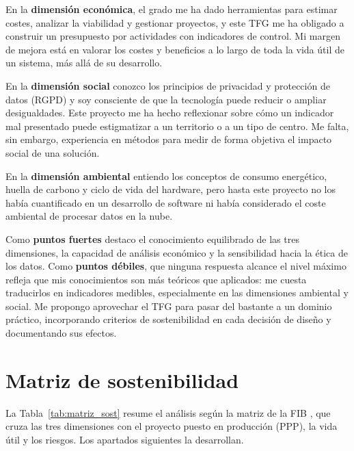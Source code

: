 \documentclass[12pt, a4paper, oneside]{report}
\begin{document}
En la \textbf{dimensión económica}, el grado me ha dado herramientas para estimar costes, analizar la viabilidad y gestionar proyectos, y este TFG me ha obligado a construir un presupuesto por actividades con indicadores de control. Mi margen de mejora está en valorar los costes y beneficios a lo largo de toda la vida útil de un sistema, más allá de su desarrollo.

En la \textbf{dimensión social} conozco los principios de privacidad y protección de datos (RGPD) y soy consciente de que la tecnología puede reducir o ampliar desigualdades. Este proyecto me ha hecho reflexionar sobre cómo un indicador mal presentado puede estigmatizar a un territorio o a un tipo de centro. Me falta, sin embargo, experiencia en métodos para medir de forma objetiva el impacto social de una solución.

En la \textbf{dimensión ambiental} entiendo los conceptos de consumo energético, huella de carbono y ciclo de vida del hardware, pero hasta este proyecto no los había cuantificado en un desarrollo de software ni había considerado el coste ambiental de procesar datos en la nube.

Como \textbf{puntos fuertes} destaco el conocimiento equilibrado de las tres dimensiones, la capacidad de análisis económico y la sensibilidad hacia la ética de los datos. Como \textbf{puntos débiles}, que ninguna respuesta alcance el nivel máximo refleja que mis conocimientos son más teóricos que aplicados: me cuesta traducirlos en indicadores medibles, especialmente en las dimensiones ambiental y social. Me propongo aprovechar el TFG para pasar del \guillemotleft{}bastante\guillemotright{} a un dominio práctico, incorporando criterios de sostenibilidad en cada decisión de diseño y documentando sus efectos.

\section{Matriz de sostenibilidad}
La Tabla~\ref{tab:matriz_sost} resume el análisis según la matriz de la FIB \cite{fib_sostenibilitat}, que cruza las tres dimensiones con el proyecto puesto en producción (PPP), la vida útil y los riesgos. Los apartados siguientes la desarrollan.
\end{document}
